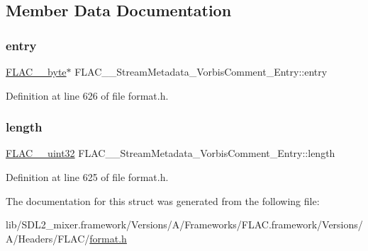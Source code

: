 \subsection{Member Data Documentation}
\mbox{\label{struct_f_l_a_c_____stream_metadata___vorbis_comment___entry_a78944f78822b92e7a4e5f15f118f6132}} 
\subsubsection{\texorpdfstring{entry}{entry}}
{\footnotesize\ttfamily \mbox{\hyperlink{ordinals_8h_a5eb569b12d5b047cdacada4d57924ee3}{F\+L\+A\+C\+\_\+\+\_\+byte}}$\ast$ F\+L\+A\+C\+\_\+\+\_\+\+Stream\+Metadata\+\_\+\+Vorbis\+Comment\+\_\+\+Entry\+::entry}



Definition at line 626 of file format.\+h.

\mbox{\label{struct_f_l_a_c_____stream_metadata___vorbis_comment___entry_aa375f16819aaa4f7e08d8009167cb19e}} 
\subsubsection{\texorpdfstring{length}{length}}
{\footnotesize\ttfamily \mbox{\hyperlink{ordinals_8h_a9c4005ea7ef8d564b0cc993cdd0e4e5e}{F\+L\+A\+C\+\_\+\+\_\+uint32}} F\+L\+A\+C\+\_\+\+\_\+\+Stream\+Metadata\+\_\+\+Vorbis\+Comment\+\_\+\+Entry\+::length}



Definition at line 625 of file format.\+h.



The documentation for this struct was generated from the following file\+:\begin{DoxyCompactItemize}
\item 
lib/\+S\+D\+L2\+\_\+mixer.\+framework/\+Versions/\+A/\+Frameworks/\+F\+L\+A\+C.\+framework/\+Versions/\+A/\+Headers/\+F\+L\+A\+C/\mbox{\hyperlink{format_8h}{format.\+h}}\end{DoxyCompactItemize}
